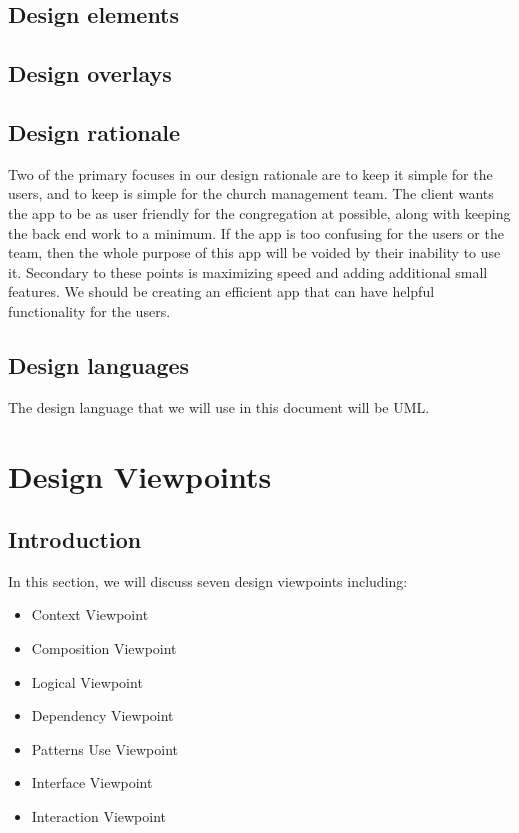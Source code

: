 \documentclass[letterpaper,10pt,draftclsnofoot,onecolumn,titlepage]{IEEEtran}
\begin{document}
		\subsection{Design elements}

		\subsection{Design overlays}

		\subsection{Design rationale}
		Two of the primary focuses in our design rationale are to keep it simple for the users, and to keep is simple for the church management team.
		The client wants the app to be as user friendly for the congregation at possible, along with keeping the back end work to a minimum.
		If the app is too confusing for the users or the team, then the whole purpose of this app will be voided by their inability to use it.
		Secondary to these points is maximizing speed and adding additional small features.
		We should be creating an efficient app that can have helpful functionality for the users.

		\subsection{Design languages}
		The design language that we will use in this document will be UML.

	\section{Design Viewpoints}

		\subsection{Introduction}
		In this section, we will discuss seven design viewpoints including:
			\begin{itemize}
				\item{Context Viewpoint}
				\item{Composition Viewpoint}
				\item{Logical Viewpoint}
				\item{Dependency Viewpoint}
				\item{Patterns Use Viewpoint}
				\item{Interface Viewpoint}
				\item{Interaction Viewpoint}
			\end{itemize}
\end{document}
